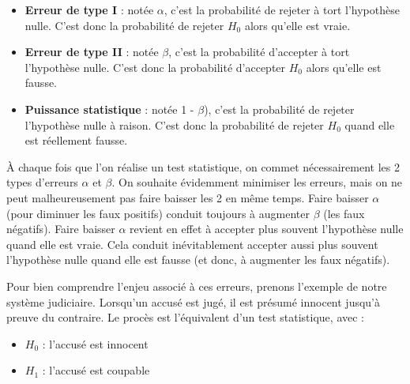 \documentclass[
  french,
  a4paper,
  DIV=11,
  numbers=noendperiod,
  oneside]{scrreprt}
\providecommand{\tightlist}{%
  \setlength{\itemsep}{0pt}\setlength{\parskip}{0pt}}
\begin{document}
\begin{tcolorbox}[enhanced jigsaw, arc=.35mm, bottomrule=.15mm, bottomtitle=1mm, breakable, colback=white, colbacktitle=quarto-callout-tip-color!10!white, colframe=quarto-callout-tip-color-frame, coltitle=black, left=2mm, leftrule=.75mm, opacityback=0, opacitybacktitle=0.6, rightrule=.15mm, title=\textcolor{quarto-callout-tip-color}{\faLightbulb}\hspace{0.5em}{Définitions}, titlerule=0mm, toprule=.15mm, toptitle=1mm]

\begin{itemize}
\item
  \textbf{Erreur de type I} : notée \(\alpha\), c'est la probabilité de
  rejeter à tort l'hypothèse nulle. C'est donc la probabilité de rejeter
  \(H_0\) alors qu'elle est vraie.
\item
  \textbf{Erreur de type II} : notée \(\beta\), c'est la probabilité
  d'accepter à tort l'hypothèse nulle. C'est donc la probabilité
  d'accepter \(H_0\) alors qu'elle est fausse.
\item
  \textbf{Puissance statistique} : notée 1 - \(\beta\)), c'est la
  probabilité de rejeter l'hypothèse nulle à raison. C'est donc la
  probabilité de rejeter \(H_0\) quand elle est réellement fausse.
\end{itemize}

\end{tcolorbox}

À chaque fois que l'on réalise un test statistique, on commet
nécessairement les 2 types d'erreurs \(\alpha\) et \(\beta\). On
souhaite évidemment minimiser les erreurs, mais on ne peut
malheureusement pas faire baisser les 2 en même temps. Faire baisser
\(\alpha\) (pour diminuer les faux positifs) conduit toujours à
augmenter \(\beta\) (les faux négatifs). Faire baisser \(\alpha\)
revient en effet à accepter plus souvent l'hypothèse nulle quand elle
est vraie. Cela conduit inévitablement accepter aussi plus souvent
l'hypothèse nulle quand elle est fausse (et donc, à augmenter les faux
négatifs).

Pour bien comprendre l'enjeu associé à ces erreurs, prenons l'exemple de
notre système judiciaire. Lorsqu'un accusé est jugé, il est présumé
innocent jusqu'à preuve du contraire. Le procès est l'équivalent d'un
test statistique, avec :

\begin{itemize}
\tightlist
\item
  \(H_0\) : l'accusé est innocent
\item
  \(H_1\) : l'accusé est coupable
\end{itemize}
\end{document}
